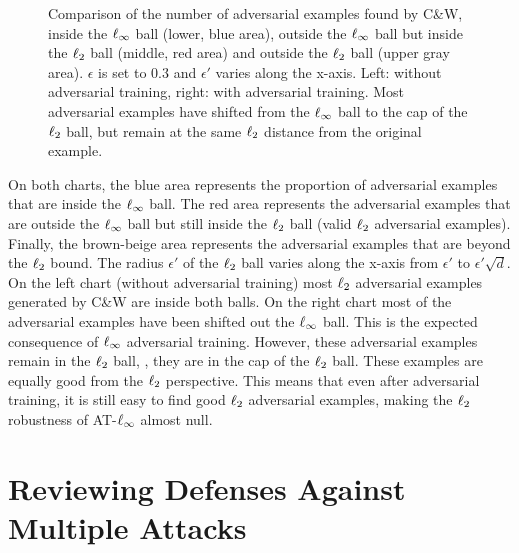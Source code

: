 \begin{figure}[htb]
    \centering
    
    \caption{Comparison of the number of adversarial examples found by C\&W, inside the $\ell_\infty $ ball (lower, blue area), outside the $\ell_\infty $ ball but inside the $\ell_2 $ ball (middle, red area) and outside the $\ell_2 $ ball (upper gray area). $\epsilon$ is set to $0.3$ and $\epsilon'$ varies along the x-axis. Left: without adversarial training, right: with adversarial training. Most adversarial examples have shifted from the $\ell_\infty $ ball to the cap of the $\ell_2 $ ball, but remain at the same $\ell_2 $ distance from the original example.}
    \label{fig:calotte}
\end{figure}

On both charts, the blue area represents the proportion of adversarial examples that are inside the $\ell_\infty $ ball.
The red area represents the adversarial examples that are outside the $\ell_\infty $ ball but still inside the $\ell_2 $ ball (valid $\ell_2 $ adversarial examples).
Finally, the brown-beige area represents the adversarial examples that are beyond the $\ell_2 $ bound.
The radius $\epsilon'$ of the $\ell_2 $ ball varies along the x-axis from $\epsilon'$ to $\epsilon' \sqrt{d}$.
On the left chart (without adversarial training) most $\ell_2 $ adversarial examples generated by C\&W are inside both balls.
On the right chart most of the adversarial examples have been shifted out the $\ell_\infty $ ball.
This is the expected consequence of $\ell_\infty $ adversarial training.
However, these adversarial examples remain in the $\ell_2 $ ball, \ie, they are in the cap of the $\ell_2 $ ball.
These examples are equally good from the $\ell_2 $ perspective.
This means that even after adversarial training, it is still easy to find good $\ell_2 $ adversarial examples, making the $\ell_2 $ robustness of AT-$\ell_\infty $ almost null. 

\section{Reviewing Defenses Against Multiple Attacks}
\label{section:ap3-reviewing_defenses_against_multiple_attacks}

